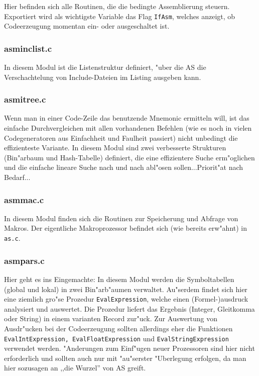 \documentclass[12pt,a4paper,twoside]{report}
\newcommand{\tty}[1]{{\tt #1}}
\newcommand{\asname}{AS}
\begin{document}
Hier befinden sich alle Routinen, die die bedingte Assemblierung steuern.
Exportiert wird als wichtigste Variable das Flag \tty{IfAsm}, welches
anzeigt, ob Codeerzeugung momentan ein- oder ausgeschaltet ist.

\subsubsection{asminclist.c}

In diesem Modul ist die Listenstruktur definiert, "uber die \asname{} die
Verschachtelung von Include-Dateien im Listing ausgeben kann.

\subsubsection{asmitree.c}

Wenn man in einer Code-Zeile das benutzende Mnemonic ermitteln will, ist
das einfache Durchvergleichen mit allen vorhandenen Befehlen (wie es noch
in vielen Codegeneratoren aus Einfachheit und Faulheit passiert) nicht
unbedingt die effizienteste Variante.  In diesem Modul sind zwei
verbesserte Strukturen (Bin"arbaum und Hash-Tabelle) definiert, die eine
effizientere Suche erm"oglichen und die einfache lineare Suche nach und
nach abl"osen sollen...Priorit"at nach Bedarf...

\subsubsection{asmmac.c}

In diesem Modul finden sich die Routinen zur Speicherung und Abfrage von
Makros.  Der eigentliche Makroprozessor befindet sich (wie bereits
erw"ahnt) in {\tt as.c}.

\subsubsection{asmpars.c}

Hier geht es ins Eingemachte: In diesem Modul werden die Symboltabellen
(global und lokal) in zwei Bin"arb"aumen verwaltet.  Au"serdem findet sich
hier eine ziemlich gro"se Prozedur \tty{EvalExpression}, welche einen
(Formel-)ausdruck analysiert und auswertet.  Die Prozedur liefert das
Ergebnis (Integer, Gleitkomma oder String) in einem varianten Record zur"uck.
Zur Auswertung von Ausdr"ucken bei der Codeerzeugung sollten allerdings eher
die Funktionen \tty{EvalIntExpression, EvalFloatExpression} und
\tty{EvalStringExpression} verwendet werden.  "Anderungen zum Einf"ugen neuer
Prozessoren sind hier nicht erforderlich und sollten auch nur mit "au"serster
"Uberlegung erfolgen, da man hier sozusagen an ,,die Wurzel'' von \asname{} greift.
\end{document}
